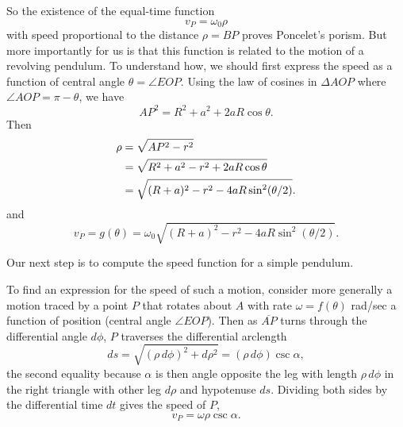 \documentclass{ximera}
\begin{document}
So the existence of the equal-time function
\[
      v_P = \omega_0 \rho
\]
with speed proportional to the distance $\rho = BP$ proves Poncelet's porism. But more importantly for us is that this function is related to the motion of a revolving pendulum. To understand how, we should first express the speed as a function of central angle $\theta = \angle EOP$. Using the law of cosines in $\Delta AOP$ where $\angle AOP = \pi - \theta$, we have
\[
  AP^2  = R^2 + a^2 + 2aR \cos \theta .
\]
Then
\begin{align*}
   \rho  &=  \sqrt{AP^2 - r^2}         \\  \notag
          & = \sqrt{R^2 + a^2 -r^2 + 2aR \cos \theta}  \\ \notag
          &=   \sqrt{(R+a)^2 - r^2 - 4aR\sin^2 (\theta/2)} .
\end{align*}
and
\begin{equation}
      v_P = g(\theta) = \omega_0  \sqrt{(R+a)^2 - r^2 - 4aR\sin^2 (\theta/2)}.  \label{Eq:PropSpeed}
\end{equation}

Our next step is to compute the speed function for a simple pendulum.








\iffalse
To find an expression for the speed of such a motion, consider more generally a motion traced by a point $P$ that rotates about $A$ with rate $\omega = f(\theta)$ rad/sec a function of position (central angle $\angle EOP$). Then as $\overline{AP}$ turns through the differential angle $d\phi$, $P$ traverses the differential arclength
\[
   ds =  \sqrt{(\rho \, d\phi)^2 + d\rho^2}   =   (\rho \, d\phi) \csc \alpha ,
\]
the second equality because $\alpha$ is then angle opposite the leg with length $\rho \, d\phi$ in the right triangle with other leg $d\rho$ and hypotenuse $ds$. Dividing both sides by the differential time $dt$ gives the speed of $P$,
\[
     v_P  = \omega \rho \csc \alpha .
\]


\end{document}
